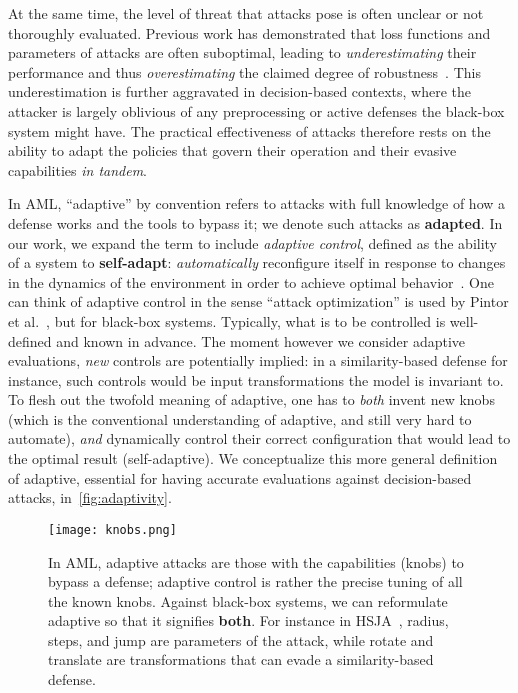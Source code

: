 At the same time, the level of threat that attacks pose is often unclear or not thoroughly evaluated.
Previous work has demonstrated that loss functions and parameters of attacks are often suboptimal, leading to \textit{underestimating} their performance and thus \textit{overestimating} the claimed degree of robustness~\cite{croce2020reliable, pintor2022indicators}.
This underestimation is further aggravated in decision-based contexts, where the attacker is largely oblivious of any preprocessing or active defenses the black-box system might have.
The practical effectiveness of attacks therefore rests on the ability to adapt the policies that govern their operation and their evasive capabilities \textit{in tandem}.

In \gls{AML}, ``adaptive'' by convention refers to attacks with full knowledge of how a defense works and the tools to bypass it; we denote such attacks as \textbf{adapted}.
In our work, we expand the term to include \textit{adaptive control}, defined as the ability of a system to \textbf{self-adapt}: \emph{automatically} reconfigure itself in response to changes in the dynamics of the environment in order to achieve optimal behavior~\cite{aastrom1995adaptive}.
One can think of adaptive control in the sense ``attack optimization'' is used by Pintor et al.~\cite{pintor2022indicators}, but for black-box systems.
Typically, what is to be controlled is well-defined and known in advance.
The moment however we consider adaptive evaluations, \textit{new} controls are potentially implied: in a similarity-based defense for instance, such controls would be input transformations the model is invariant to.
To flesh out the twofold meaning of adaptive, one has to \textit{both} invent new knobs~\cite{hofstadter2008metamagical} (which is the conventional understanding of adaptive, and still very hard to automate), \textit{and} dynamically control their correct configuration that would lead to the optimal result (self-adaptive).
We conceptualize this more general definition of adaptive, essential for having accurate evaluations against decision-based attacks, in~\autoref{fig:adaptivity}.

\begin{figure}
  \centering
  \texttt{[image: knobs.png]}
  \caption{In \gls{AML}, adaptive attacks are those with the capabilities (knobs) to bypass a defense; adaptive control is rather the precise tuning of all the known knobs. Against black-box systems, we can reformulate adaptive so that it signifies \textbf{both}. For instance in HSJA~\cite{chen2020hopskipjumpattack}, radius, steps, and jump are parameters of the attack, while rotate and translate are transformations that can evade a similarity-based defense.}
  \label{fig:adaptivity}
\end{figure}

